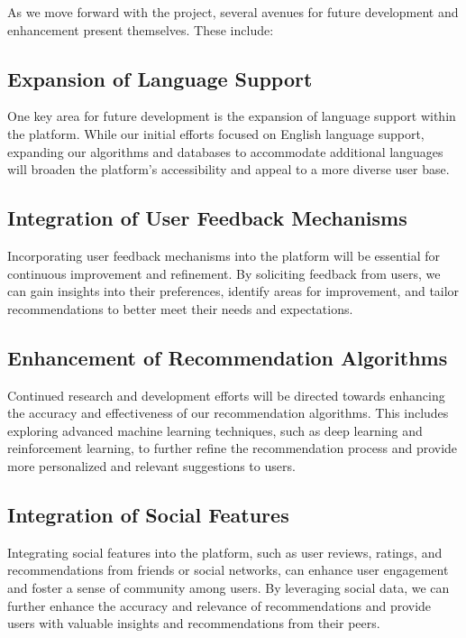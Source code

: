 \documentclass{article}
\begin{document}
As we move forward with the project, several avenues for future development and enhancement present themselves. These include:

\subsection{Expansion of Language Support}

One key area for future development is the expansion of language support within the platform. While our initial efforts focused on English language support, expanding our algorithms and databases to accommodate additional languages will broaden the platform's accessibility and appeal to a more diverse user base.

\subsection{Integration of User Feedback Mechanisms}

Incorporating user feedback mechanisms into the platform will be essential for continuous improvement and refinement. By soliciting feedback from users, we can gain insights into their preferences, identify areas for improvement, and tailor recommendations to better meet their needs and expectations.

\subsection{Enhancement of Recommendation Algorithms}

Continued research and development efforts will be directed towards enhancing the accuracy and effectiveness of our recommendation algorithms. This includes exploring advanced machine learning techniques, such as deep learning and reinforcement learning, to further refine the recommendation process and provide more personalized and relevant suggestions to users.

\subsection{Integration of Social Features}

Integrating social features into the platform, such as user reviews, ratings, and recommendations from friends or social networks, can enhance user engagement and foster a sense of community among users. By leveraging social data, we can further enhance the accuracy and relevance of recommendations and provide users with valuable insights and recommendations from their peers.
\end{document}
